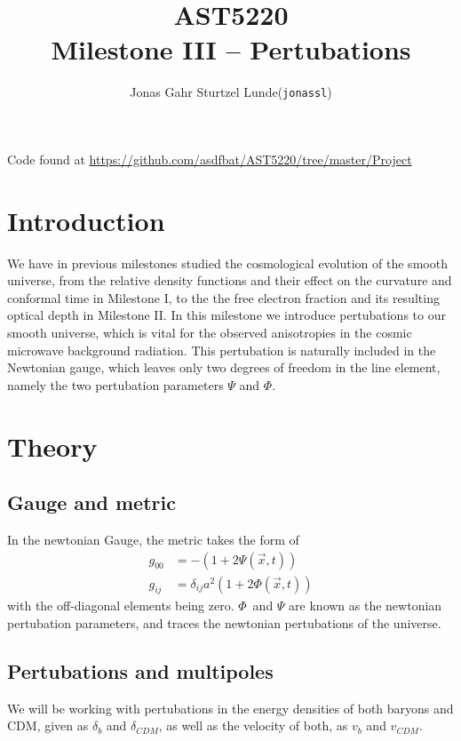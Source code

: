 \documentclass[10pt, a4paper]{article}
\begin{document}
\title{AST5220\\ Milestone III -- Pertubations}
\author{
    \begin{tabular}{r l}
        Jonas Gahr Sturtzel Lunde & (\texttt{jonassl})
    \end{tabular}}

\maketitle
Code found at \url{https://github.com/asdfbat/AST5220/tree/master/Project}
\vspace{0.7cm}

\section{Introduction}
We have in previous milestones studied the cosmological evolution of the smooth universe, from the relative density functions and their effect on the curvature and conformal time in Milestone I, to the the free electron fraction and its resulting optical depth in Milestone II. In this milestone we introduce pertubations to our smooth universe, which is vital for the observed anisotropies in the cosmic microwave background radiation. This pertubation is naturally included in the Newtonian gauge, which leaves only two degrees of freedom in the line element, namely the two pertubation parameters $\Psi$ and $\Phi$.


\section{Theory}
\subsection{Gauge and metric}
In the newtonian Gauge, the metric takes the form of
\begin{equation}
    \begin{aligned}
        g_{00} &= - (1 + 2\Psi(\vec x,t)) \\ 
        g_{ij} &= \delta_{ij}a^2(1 + 2\Phi(\vec x, t))
    \end{aligned}
\end{equation}
with the off-diagonal elements being zero. $\Phi$ and $\Psi$ are known as the newtonian pertubation parameters, and traces the newtonian pertubations of the universe.


\subsection{Pertubations and multipoles}
We will be working with pertubations in the energy densities of both baryons and CDM, given as $\delta_{b}$ and $\delta_{CDM}$, as well as the velocity of both, as $v_{b}$ and $v_{CDM}$.
\end{document}
